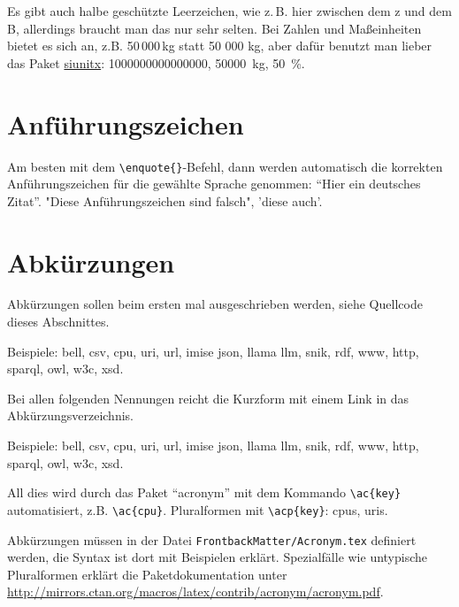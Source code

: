 Es gibt auch halbe geschützte Leerzeichen, wie z.\,B. hier zwischen dem z und dem B, allerdings braucht man das nur sehr selten. Bei Zahlen und Maßeinheiten bietet es sich an, z.B. 50\,000\,kg statt 50 000 kg, aber dafür benutzt man lieber das Paket \href{http://mirrors.ctan.org/macros/latex/contrib/siunitx/siunitx.pdf}{siunitx}: \num{1000000000000000}, \SI{50000}{\kg}, \SI{50}{\%}.

\section{Anführungszeichen}
Am besten mit dem \verb+\enquote{}+-Befehl, dann werden automatisch die korrekten Anführungszeichen für die gewählte Sprache genommen: \enquote{Hier ein deutsches Zitat}.
"Diese Anführungszeichen sind falsch", 'diese auch'.

\section{Abkürzungen}
Abkürzungen sollen beim ersten mal ausgeschrieben werden, siehe Quellcode dieses Abschnittes.

Beispiele: \ac{bell}, \ac{csv}, \ac{cpu}, \ac{uri}, \ac{url}, \ac{imise} \ac{json}, \ac{llama} \ac{llm}, \ac{snik}, \ac{rdf}, \ac{www}, \ac{http}, \ac{sparql}, \ac{owl}, \ac{w3c}, \ac{xsd}.

Bei allen folgenden Nennungen reicht die Kurzform mit einem Link in das Abkürzungsverzeichnis.

Beispiele: \ac{bell}, \ac{csv}, \ac{cpu}, \ac{uri}, \ac{url}, \ac{imise} \ac{json}, \ac{llama} \ac{llm}, \ac{snik}, \ac{rdf}, \ac{www}, \ac{http}, \ac{sparql}, \ac{owl}, \ac{w3c}, \ac{xsd}.

All dies wird durch das Paket \enquote{acronym} mit dem Kommando \verb+\ac{key}+ automatisiert, z.B. \verb+\ac{cpu}+.
Pluralformen mit \verb+\acp{key}+: \acp{cpu}, \acp{uri}.

Abkürzungen müssen in der Datei \texttt{FrontbackMatter/Acronym.tex} definiert werden, die Syntax ist dort mit Beispielen erklärt.
Spezialfälle wie untypische Pluralformen erklärt die Paketdokumentation unter \url{http://mirrors.ctan.org/macros/latex/contrib/acronym/acronym.pdf}.
